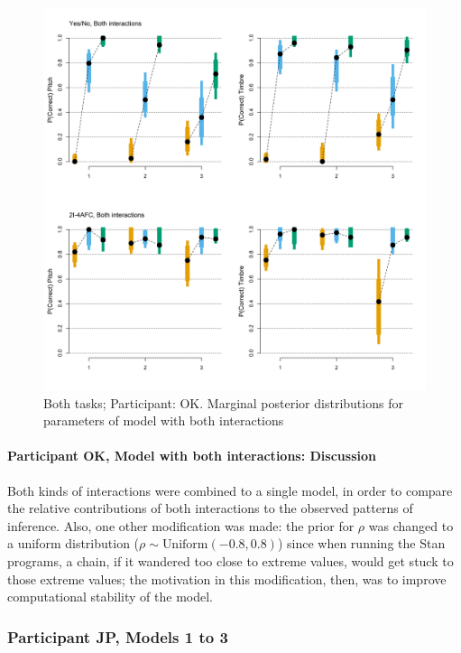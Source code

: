 \documentclass{article}\usepackage{knitr}
\begin{document}
\begin{figure}[H]
\centering
\includegraphics[scale=0.50, angle = 270]{Analysis_of_Human_Data/OK_post_pred_both}
\caption{Both tasks; Participant: OK. Marginal posterior distributions for parameters of model with both interactions}
\label{fig:OK_post_pred_both}
\end{figure}

\paragraph{Participant OK, Model with both interactions: Discussion}

Both kinds of interactions were combined to a single model, in order to compare the relative contributions of both interactions to the observed patterns of inference. Also, one other modification was made: the prior for $\rho$ was changed to a uniform distribution ($\rho \sim \text{Uniform}(-0.8, 0.8)$) since when running the Stan programs, a chain, if it wandered too close to extreme values, would get stuck to those extreme values; the motivation in this  modification, then, was to improve computational stability of the model. 

\subsubsection{Participant JP, Models 1 to 3}
\end{document}
